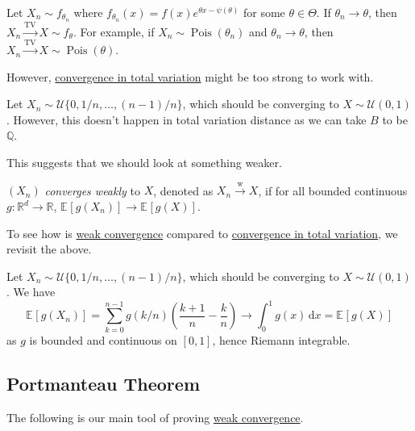 \begin{eg}
	Let \(X_n \sim f_{\theta _n}\) where \(f_{\theta _n}(x) = f(x) e^{\theta x - \psi (\theta )}\) for some \(\theta \in \Theta \). If \(\theta _n \to \theta \), then \(X_n \overset{\operatorname{TV} }{\to } X \sim f_\theta \). For example, if \(X_n \sim \operatorname{Pois}(\theta _n) \) and \(\theta _n \to \theta \), then \(X_n \overset{\operatorname{TV} }{\to } X \sim \operatorname{Pois}(\theta ) \).
\end{eg}

However, \hyperref[def:convergence-in-total-variation]{convergence in total variation} might be too strong to work with.

\begin{eg}
	Let \(X_n \sim \mathcal{U} \{ 0, 1 / n, \dots , (n-1) / n \} \), which should be converging to \(X \sim \mathcal{U} (0, 1)\). However, this doesn't happen in total variation distance as we can take \(B\) to be \(\mathbb{Q} \).
\end{eg}

This suggests that we should look at something weaker.

\begin{definition}\label{def:weak-convergence}
	\((X_n)\) \emph{converges weakly} to \(X\), denoted as \(X_n \overset{\text{w} }{\to } X\), if for all bounded continuous \(g \colon \mathbb{R} ^d \to \mathbb{R} \), \(\mathbb{E}_{}\left[g(X_n) \right] \to \mathbb{E}_{}\left[g(X) \right]\).
\end{definition}

To see how is \hyperref[def:weak-convergence]{weak convergence} compared to \hyperref[def:convergence-in-total-variation]{convergence in total variation}, we revisit the above.

\begin{eg}
	Let \(X_n \sim \mathcal{U} \{ 0, 1 / n, \dots , (n-1) / n \} \), which should be converging to \(X \sim \mathcal{U} (0, 1)\). We have
	\[
		\mathbb{E}_{}\left[g(X_n) \right]
		= \sum_{k=0}^{n-1} g(k / n) \left( \frac{k+1}{n} - \frac{k}{n} \right)
		\to \int_{0}^{1} g(x) \,\mathrm{d}x
		= \mathbb{E}_{}\left[g(X) \right]
	\]
	as \(g\) is bounded and continuous on \([0, 1]\), hence Riemann integrable.
\end{eg}

\subsection{Portmanteau Theorem}
The following is our main tool of proving \hyperref[def:weak-convergence]{weak convergence}.

